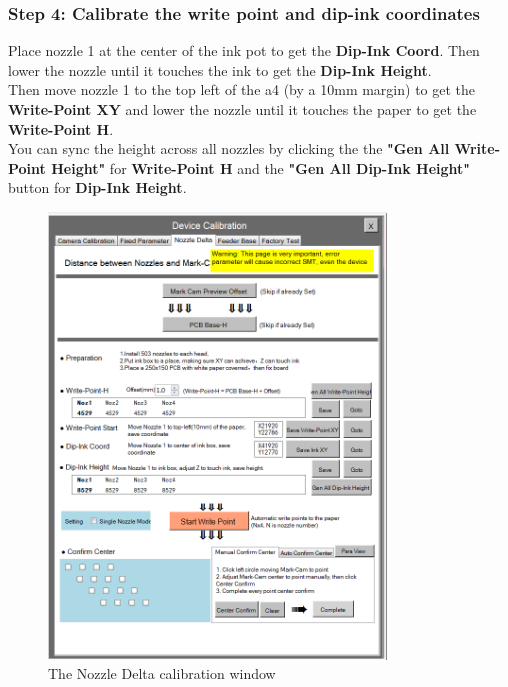 \documentclass[a4paper,10pt]{report}
\begin{document}
\subsubsection{Step 4: Calibrate the write point and dip-ink coordinates}
Place nozzle 1 at the center of the ink pot to get the \textbf{Dip-Ink Coord}. Then lower the nozzle until it touches the ink to get the \textbf{Dip-Ink Height}.\\
Then move nozzle 1 to the top left of the a4 (by a 10mm margin) to get the \textbf{Write-Point XY} and lower the nozzle until it touches the paper to get the \textbf{Write-Point H}.\\
You can sync the height across all nozzles by clicking the the \textbf{"Gen All Write-Point Height"} for \textbf{Write-Point H} and the \textbf{"Gen All Dip-Ink Height"} button for \textbf{Dip-Ink Height}.
 \begin{figure}[!htb]
 \centering
 \includegraphics[width=0.8\textwidth]{scrot35.png}
 \caption{The Nozzle Delta calibration window}
\end{figure}
\newpage
\end{document}
